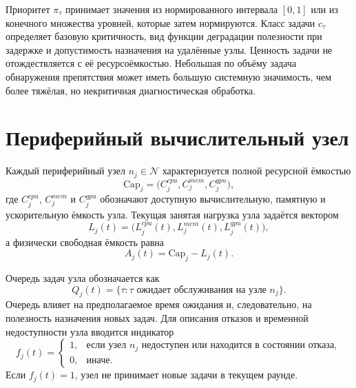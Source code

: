 Приоритет $\pi_{\tau}$ принимает значения из нормированного интервала $[0,1]$ или из конечного множества уровней, которые затем нормируются. Класс задачи $c_{\tau}$ определяет базовую критичность, вид функции деградации полезности при задержке и допустимость назначения на удалённые узлы. Ценность задачи не отождествляется с её ресурсоёмкостью. Небольшая по объёму задача обнаружения препятствия может иметь большую системную значимость, чем более тяжёлая, но некритичная диагностическая обработка.

\section{Периферийный вычислительный узел}

Каждый периферийный узел $n_j\in\mathcal{N}$ характеризуется полной ресурсной ёмкостью
\begin{equation}
    \mathrm{Cap}_j=\bigl(C^{cpu}_j,C^{mem}_j,C^{gpu}_j\bigr),
    \label{eq:ch2_capacity}
\end{equation}
где $C^{cpu}_j$, $C^{mem}_j$ и $C^{gpu}_j$ обозначают доступную вычислительную, памятную и ускорительную ёмкость узла. Текущая занятая нагрузка узла задаётся вектором
\begin{equation}
    L_j(t)=\bigl(L^{cpu}_j(t),L^{mem}_j(t),L^{gpu}_j(t)\bigr),
    \label{eq:ch2_load}
\end{equation}
а физически свободная ёмкость равна
\begin{equation}
    A_j(t)=\mathrm{Cap}_j-L_j(t).
    \label{eq:ch2_available}
\end{equation}

Очередь задач узла обозначается как
\begin{equation}
    Q_j(t)=\{\tau: \tau \text{ ожидает обслуживания на узле } n_j\}.
    \label{eq:ch2_queue}
\end{equation}
Очередь влияет на предполагаемое время ожидания и, следовательно, на полезность назначения новых задач. Для описания отказов и временной недоступности узла вводится индикатор
\begin{equation}
    f_j(t)=
    \begin{cases}
        1, & \text{если узел } n_j \text{ недоступен или находится в состоянии отказа},\\
        0, & \text{иначе.}
    \end{cases}
    \label{eq:ch2_failure_indicator}
\end{equation}
Если $f_j(t)=1$, узел не принимает новые задачи в текущем раунде.

